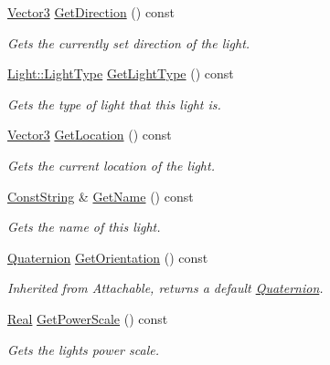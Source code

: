 \begin{DoxyCompactItemize}
\hyperlink{classMezzanine_1_1Vector3}{Vector3} \hyperlink{classMezzanine_1_1Light_a86b7fec45b3b9476a5f02cee0386c29c}{GetDirection} () const 
\begin{DoxyCompactList}\small\item\em Gets the currently set direction of the light. \item\end{DoxyCompactList}\item 
\hyperlink{classMezzanine_1_1Light_a783df27d8261c5af2226bc75586944be}{Light::LightType} \hyperlink{classMezzanine_1_1Light_aab2517f0763552587f7d21e60e167069}{GetLightType} () const 
\begin{DoxyCompactList}\small\item\em Gets the type of light that this light is. \item\end{DoxyCompactList}\item 
\hyperlink{classMezzanine_1_1Vector3}{Vector3} \hyperlink{classMezzanine_1_1Light_a997d299abec130a6a9111b5659a6b0d2}{GetLocation} () const 
\begin{DoxyCompactList}\small\item\em Gets the current location of the light. \item\end{DoxyCompactList}\item 
\hyperlink{namespaceMezzanine_a63cd699ac54b73953f35ec9cfc05e506}{ConstString} \& \hyperlink{classMezzanine_1_1Light_a1488e39ce34aab274ee5618aeb1f810d}{GetName} () const 
\begin{DoxyCompactList}\small\item\em Gets the name of this light. \item\end{DoxyCompactList}\item 
\hyperlink{classMezzanine_1_1Quaternion}{Quaternion} \hyperlink{classMezzanine_1_1Light_a08a415b00c94345ebb5155fa15819296}{GetOrientation} () const 
\begin{DoxyCompactList}\small\item\em Inherited from Attachable, returns a default \hyperlink{classMezzanine_1_1Quaternion}{Quaternion}. \item\end{DoxyCompactList}\item 
\hyperlink{namespaceMezzanine_a726731b1a7df72bf3583e4a97282c6f6}{Real} \hyperlink{classMezzanine_1_1Light_a3206b96ca2e21c861e3a141464709beb}{GetPowerScale} () const 
\begin{DoxyCompactList}\small\item\em Gets the lights power scale. \item\end{DoxyCompactList}\item 

\end{DoxyCompactItemize}

